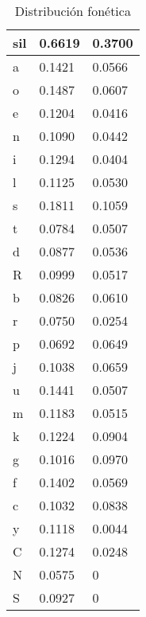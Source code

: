 \begin{table}[H]
\centering
\caption{Distribución fonética}
\label{tab:duracion_promedio_fonemas}
\begin{tabular}{|l|l|l|}
sil & 0.6619 & 0.3700 \\ \hline
a   & 0.1421 & 0.0566 \\ \hline
o   & 0.1487 & 0.0607 \\ \hline
e   & 0.1204 & 0.0416 \\ \hline
n   & 0.1090 & 0.0442 \\ \hline
i   & 0.1294 & 0.0404 \\ \hline
l   & 0.1125 & 0.0530 \\ \hline
s   & 0.1811 & 0.1059 \\ \hline
t   & 0.0784 & 0.0507 \\ \hline
d   & 0.0877 & 0.0536 \\ \hline
R   & 0.0999 & 0.0517 \\ \hline
b   & 0.0826 & 0.0610 \\ \hline
r   & 0.0750 & 0.0254 \\ \hline
p   & 0.0692 & 0.0649 \\ \hline
j   & 0.1038 & 0.0659 \\ \hline
u   & 0.1441 & 0.0507 \\ \hline
m   & 0.1183 & 0.0515 \\ \hline
k   & 0.1224 & 0.0904 \\ \hline
g   & 0.1016 & 0.0970 \\ \hline
f   & 0.1402 & 0.0569  \\ \hline
c   & 0.1032 & 0.0838  \\ \hline
y   & 0.1118 & 0.0044  \\ \hline
C   & 0.1274 & 0.0248  \\ \hline
N   & 0.0575 & 0  \\ \hline
S   & 0.0927 & 0  \\ \hline
\end{tabular}
\end{table}